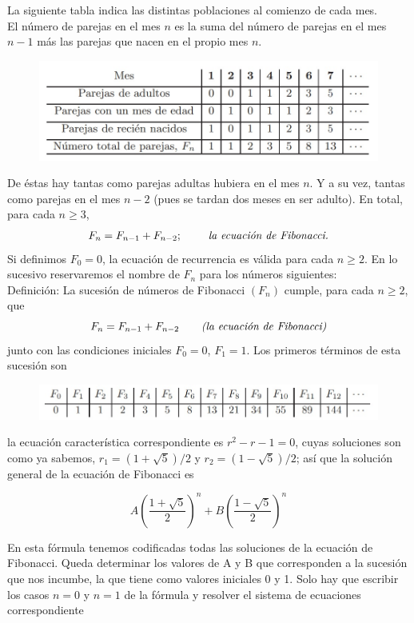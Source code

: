 \documentclass{article}
\begin{document}
La siguiente tabla indica las distintas poblaciones al comienzo de cada mes.\\
El número de parejas en el mes $n$ es la suma del número de parejas en el mes $n-1$ más las parejas que nacen en el propio mes $n$.

\begin{figure}[h]
    \centering
    \includegraphics[scale=0.5]{y.jpg}
\end{figure}

De éstas hay tantas como parejas adultas hubiera en el mes $n$. Y a su vez, tantas como parejas en el mes $n-2$ (pues se tardan dos meses en ser adulto). En total, para cada $n \geq 3$,
$$F_n = F_{n-1} + F_{n-2}; \textit{ \qquad la ecuación de Fibonacci.}$$
Si definimos $F_0 = 0$, la ecuación de recurrencia es válida para cada $n \geq 2$. En lo sucesivo reservaremos el nombre de $F_n$ para los números siguientes:\\


Definición: La sucesión de números de Fibonacci $(F_n)$ cumple, para cada $n \geq 2$, que
$$F_n=F_{n-1} + F_{n-2} \textit{\qquad (la ecuación de Fibonacci)}$$
junto con las condiciones iniciales $F_0=0$, $F_1=1$. Los primeros términos de esta sucesión son

\begin{figure}[h]
    \centering
    \includegraphics[scale=0.5]{x.jpg}
\end{figure}

la ecuación característica correspondiente es $r^2 - r -1 =0$, cuyas soluciones son como ya sabemos, $r_1 = (1 + \sqrt{5})/2$ y $r_2 = (1 - \sqrt{5})/2$; así que la solución general de la ecuación de Fibonacci es 

$$A (\frac{1 + \sqrt{5}}{2})^n + B(\frac{1-\sqrt{5}}{2})^n$$

En esta fórmula tenemos codificadas todas las soluciones de la ecuación de Fibonacci. Queda determinar los valores de A y B que corresponden a la sucesión que nos incumbe, la que tiene como valores iniciales 0 y 1. Solo hay que escribir los casos $n=0$ y $n=1$ de la fórmula y resolver el sistema de ecuaciones correspondiente 
\end{document}
